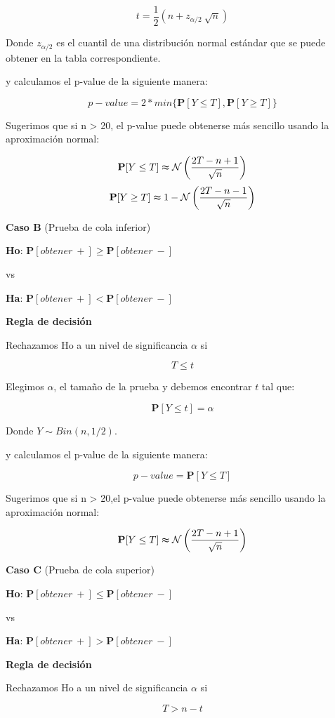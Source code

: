 \documentclass[a4paper,oneside,openany]{book}
\begin{document}
\[t=\frac{1}{2}\left(n+z_{\alpha/2}\ \sqrt{n}\right)\]

Donde \(z_{\alpha/2}\) es el cuantil de una distribución normal estándar
que se puede obtener en la tabla correspondiente.

y calculamos el p-value de la siguiente manera:

\[p-value=2*min\{\mathbf{P}[Y\leq T],\mathbf{P}[Y\geq T]\}\]

Sugerimos que si n \textgreater{} 20, el p-value puede obtenerse más
sencillo usando la aproximación normal:

\[\mathbf{P}[Y\leq T] \thickapprox  \mathcal{N}\left(\frac{2T-n+1}{\sqrt{n}}\right)\]
\[\mathbf{P}[Y\geq T] \thickapprox 1- \mathcal{N} \left(\frac{2T-n-1}{\sqrt{n}}\right)\]

\textbf{Caso B} (Prueba de cola inferior)

\textbf{Ho}: \(\mathbf{P}[obtener\ +] \geq \mathbf{P}[obtener\ -]\)

vs

\textbf{Ha}: \(\mathbf{P}[obtener\ +] < \mathbf{P}[obtener\ -]\)

\textbf{Regla de decisión}

Rechazamos Ho a un nivel de significancia \(\alpha\) si

\[T \leq t\]

Elegimos \(\alpha\), el tamaño de la prueba y debemos encontrar \(t\)
tal que:

\[\mathbf{P}[Y \leq t]=\alpha\]

Donde \(Y \sim Bin (n,1/2)\).

y calculamos el p-value de la siguiente manera:

\[p-value=\mathbf{P}[Y\leq T]\]

Sugerimos que si n \textgreater{} 20,el p-value puede obtenerse más
sencillo usando la aproximación normal:

\[\mathbf{P}[Y\leq T] \thickapprox  \mathcal{N} \left(\frac{2T-n+1}{\sqrt{n}}\right)\]

\textbf{Caso C} (Prueba de cola superior)

\textbf{Ho}: \(\mathbf{P}[obtener\ +] \leq \mathbf{P}[obtener\ -]\)

vs

\textbf{Ha}: \(\mathbf{P}[obtener\ +] > \mathbf{P}[obtener\ -]\)

\textbf{Regla de decisión}

Rechazamos Ho a un nivel de significancia \(\alpha\) si

\[T > n-t\]
\end{document}
